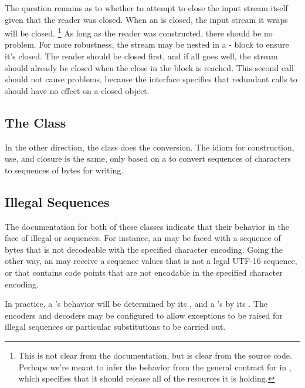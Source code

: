 The question remains as to whether to attempt to close the input
stream itself given that the reader was closed.  When an
 is closed, the input stream it wraps will be
closed.%
%
\footnote{This is not clear from the documentation, but is clear from
  the source code.  Perhaps we're meant to infer the behavior from the
  general contract for  in , which
  specifies that it should release all of the resources it is holding.}
%
As long as the reader was constructed, there should be no problem.
For more robustness, the stream may be nested in a
- block to ensure it's closed.  The reader
should be closed first, and if all goes well, the stream should
already be closed when the close in the  block is
reached.  This second call should not cause problems, because the
 interface specifies that redundant calls to
 should have no effect on a closed object.

\subsection{The  Class}

In the other direction, the class  does the
conversion.  The idiom for construction, use, and closure is the same,
only based on a  to convert sequences of
characters to sequences of bytes for writing.

\subsection{Illegal Sequences}

The documentation for both of these classes indicate that their
behavior in the face of illegal  or  sequences.
For instance, an  may be faced with a sequence
of bytes that is not decodeable with the specified character encoding.
Going the other way, an  may receive a
sequence  values that is not a legal UTF-16 sequence, or
that contains code points that are not encodable in the specified
character encoding.  

In practice, a 's behavior will be determined
by its , and a 's by its
.  The encoders and decoders may be configured to
allow exceptions to be raised for illegal sequences or particular
substitutions to be carried out.


